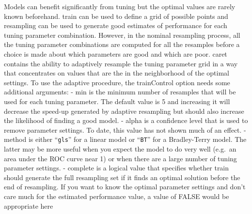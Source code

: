 \documentclass[
]{book}
\begin{document}
Models can benefit significantly from tuning but the optimal values are rarely known beforehand. train can be used to define a grid of possible points and resampling can be used to generate good estimates of performance for each tuning parameter combination. However, in the nominal resampling process, all the tuning parameter combinations are computed for all the resamples before a choice is made about which parameters are good and which are poor.
caret contains the ability to adaptively resample the tuning parameter grid in a way that concentrates on values that are the in the neighborhood of the optimal settings.
To use the adaptive procedure, the trainControl option needs some additional arguments:
- min is the minimum number of resamples that will be used for each tuning parameter. The default value is 5 and increasing it will decrease the speed-up generated by adaptive resampling but should also increase the likelihood of finding a good model.
- alpha is a confidence level that is used to remove parameter settings. To date, this value has not shown much of an effect.
- method is either ``\texttt{gls}'' for a linear model or ``\texttt{BT}'' for a Bradley-Terry model. The latter may be more useful when you expect the model to do very well (e.g.~an area under the ROC curve near 1) or when there are a large number of tuning parameter settings.
- complete is a logical value that specifies whether train should generate the full resampling set if it finds an optimal solution before the end of resampling. If you want to know the optimal parameter settings and don't care much for the estimated performance value, a value of FALSE would be appropriate here
\end{document}
